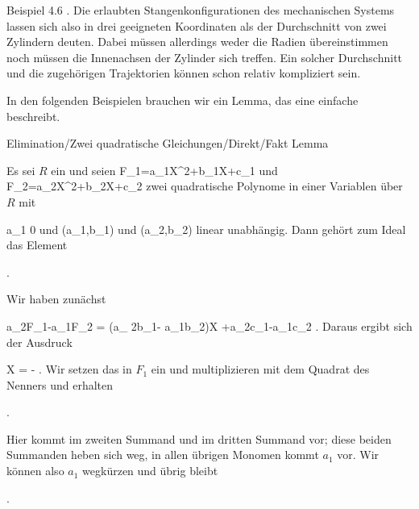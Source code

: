 Beispiel 4.6
.
Die erlaubten Stangenkonfigurationen des mechanischen Systems lassen sich also in drei geeigneten Koordinaten als der Durchschnitt von zwei Zylindern deuten. Dabei müssen allerdings weder die Radien übereinstimmen noch müssen die Innenachsen der Zylinder sich treffen. Ein solcher Durchschnitt und die zugehörigen Trajektorien können schon relativ kompliziert sein.

In den folgenden Beispielen brauchen wir ein Lemma, das eine einfache  {} beschreibt.



{Elimination/Zwei quadratische Gleichungen/Direkt/Fakt}
{Lemma}
{}
{



Es sei $R$ ein
und seien
\mathkor {} {F_1=a_1X^2+b_1X+c_1} {und} {F_2=a_2X^2+b_2X+c_2} {}
zwei quadratische Polynome in einer Variablen über $R$ mit

\mavergleichskette
{\vergleichskette
{ a_1
}
{ \neq }{ 0
}
{  }{
}
{    }{
}
{   }{
}
}
{}{}{}
und
\mathkor {} {(a_1,b_1)} {und} {(a_2,b_2)} {}
linear unabhängig. Dann gehört zum Ideal
 das Element

 { . }






}
{





Wir haben zunächst

\mavergleichskettedisp
{\vergleichskette
{ a_2F_1-a_1F_2
}
{ =} { (a_ 2b_1- a_1b_2)X +a_2c_1-a_1c_2
}
{ } {
}
{ } {
}
{ } {
}
}
{}{}{.}
Daraus ergibt sich der Ausdruck
 {} {}

\mavergleichskettedisp
{\vergleichskette
{X
}
{ =} { -
}
{ } {
}
{ } {
}
{ } {
}
}
{}{}{.}
Wir setzen das in $F_1$ ein und multiplizieren mit dem Quadrat des Nenners und erhalten

 { . }

Hier kommt im zweiten Summand
 und im dritten Summand
 vor; diese beiden Summanden heben sich weg, in allen übrigen Monomen kommt $a_1$ vor.
Wir können also $a_1$ wegkürzen und übrig bleibt

 { . }





}




